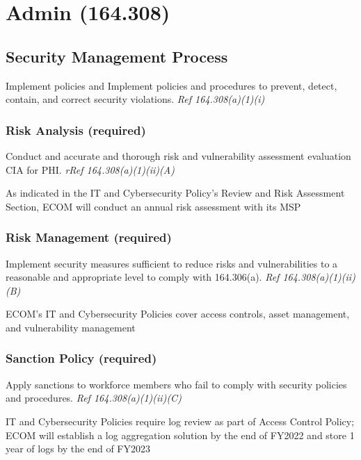 \documentclass[../main.tex]{subfiles}
\begin{document}
\section{Admin (164.308)}
    \subsection{Security Management Process}
        Implement policies and Implement policies and procedures to prevent, detect, contain, and correct security violations. \emph{Ref 164.308(a)(1)(i)}\cite{us}

        \subsubsection{Risk Analysis (required)}
            Conduct and accurate and thorough risk and vulnerability assessment evaluation CIA for PHI. \emph{rRef 164.308(a)(1)(ii)(A)}\cite{us}

            \vspace{3mm}

            \noindent As indicated in the IT and Cybersecurity Policy's Review and Risk Assessment Section, ECOM will conduct an annual risk assessment with its MSP

        \subsubsection{Risk Management (required)}
            Implement security measures sufficient to reduce risks and vulnerabilities to a reasonable and appropriate level to comply with 164.306(a). \emph{Ref 164.308(a)(1)(ii)(B)}\cite{us}

            \vspace{3mm}

            \noindent ECOM's IT and Cybersecurity Policies cover access controls, asset management, and vulnerability management

        \subsubsection{Sanction Policy (required)}
            Apply sanctions to workforce members who fail to comply with security policies and procedures. \emph{Ref 164.308(a)(1)(ii)(C)}\cite{us}

            \vspace{3mm}

            \noindent IT and Cybersecurity Policies require log review as part of Access Control Policy; ECOM will establish a log aggregation solution by the end of FY2022 and store 1 year of logs by the end of FY2023
\end{document}
